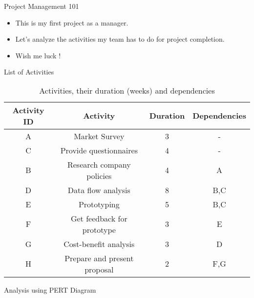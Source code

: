 \begin{frame}{Project Management 101}

\begin{itemize}
    \item<1-> This is my first project as a manager. 
    \item<2-> Let's analyze the activities my team has to do for project completion.
    \item<3-> Wish me luck !
\end{itemize}

\end{frame}


\begin{frame}{List of Activities}

\begin{table}[scale=0.5]
    \centering
    \begin{tabular}{|c|c|c|c|}
        \hline
        \textbf{Activity ID} & \textbf{Activity} & \textbf{Duration} & 
        \textbf{Dependencies} \\
         \hline
         \hline
         A & Market Survey & 3 & -\\\hline
         C & Provide questionnaires & 4 & -\\\hline
         B & Research company policies & 4 & A\\\hline
         D & Data flow analysis & 8 & B,C\\\hline
         E & Prototyping & 5 & B,C\\\hline
         F & Get feedback for prototype & 3 & E\\\hline
         G & Cost-benefit analysis & 3 & D\\\hline
         H & Prepare and present proposal & 2 & F,G\\\hline         
    
    \end{tabular}
    \caption{Activities, their duration (weeks) and dependencies}
    \label{tab:activities}
\end{table}

\end{frame}

\begin{frame}{Analysis using PERT Diagram}

\end{frame}

